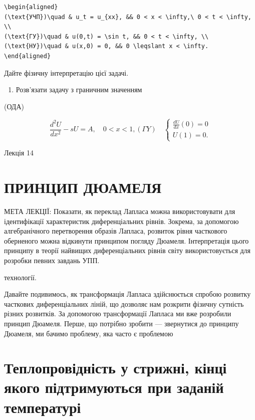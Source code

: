 \documentclass[
  ukrainian,
]{article}
\providecommand{\tightlist}{%
  \setlength{\itemsep}{0pt}\setlength{\parskip}{0pt}}
\begin{document}
\begin{verbatim}
\begin{aligned}
(\text{УЧП})\quad & u_t = u_{xx}, && 0 < x < \infty,\ 0 < t < \infty, \\
(\text{ГУ})\quad & u(0,t) = \sin t, && 0 < t < \infty, \\
(\text{НУ})\quad & u(x,0) = 0, && 0 \leqslant x < \infty.
\end{aligned}
\end{verbatim}

Дайте фізичну інтерпретацію цієї задачі.

\begin{enumerate}
\def\labelenumi{\arabic{enumi}.}
\setcounter{enumi}{3}
\tightlist
\item
  Розв'язати задачу з граничним значенням
\end{enumerate}

(ОДА)

\[
\frac{d^2U}{dx^2} - sU = A, \quad 0 < x < 1,
(\Gamma Y) \quad
\begin{cases} \frac{dU}{dx} (0) = 0 \\ U(1) = 0. \end{cases}
\]

Лекція 14

\section{ПРИНЦИП
ДЮАМЕЛЯ}\label{ux43fux440ux438ux43dux446ux438ux43f-ux434ux44eux430ux43cux435ux43bux44f}

МЕТА ЛЕКЦІЇ: Показати, як переклад Лапласа можна використовувати для
ідентифікації характеристик диференціальних рівнів. Зокрема, за
допомогою алгебранічного перетворення образів Лапласа, розвиток рівня
часткового оберненого можна відкинути принципом погляду Дюамеля.
Інтерпретація цього принципу в теорії найвищих диференціальних рівнів
світу використовується для розробки певних завдань УПП.

технології.

Давайте подивимось, як трансформація Лапласа здійснюється спробою
розвитку часткових диференціальних ліній, що дозволяє нам розкрити
фізичну сутність різних розвитків. За допомогою трансформації Лапласа ми
вже розробили принцип Дюамеля. Перше, що потрібно зробити --- звернутися
до принципу Дюамеля, ми бачимо проблему, яка часто є проблемою

\section{Теплопровідність у стрижні, кінці якого підтримуються при
заданій
температурі}\label{ux442ux435ux43fux43bux43eux43fux440ux43eux432ux456ux434ux43dux456ux441ux442ux44c-ux443-ux441ux442ux440ux438ux436ux43dux456-ux43aux456ux43dux446ux456-ux44fux43aux43eux433ux43e-ux43fux456ux434ux442ux440ux438ux43cux443ux44eux442ux44cux441ux44f-ux43fux440ux438-ux437ux430ux434ux430ux43dux456ux439-ux442ux435ux43cux43fux435ux440ux430ux442ux443ux440ux456}
\end{document}

